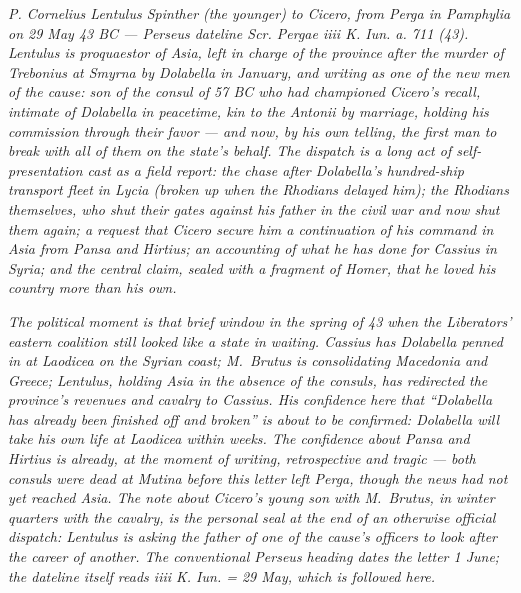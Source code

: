 
\textit{P. Cornelius Lentulus Spinther (the younger) to Cicero,
from Perga in Pamphylia on 29 May 43 BC --- Perseus dateline
\textit{Scr. Pergae iiii K. Iun. a. 711 (43)}.
Lentulus is proquaestor of Asia, left in charge of the province
after the murder of Trebonius at Smyrna by Dolabella in January,
and writing as one of the new men of the cause: son of the consul of
57 BC who had championed Cicero's recall, intimate of Dolabella in
peacetime, kin to the Antonii by marriage, holding his commission
through their favor --- and now, by his own telling, the first man
to break with all of them on the state's behalf. The dispatch is a
long act of self-presentation cast as a field report: the chase
after Dolabella's hundred-ship transport fleet in Lycia (broken up
when the Rhodians delayed him); the Rhodians themselves, who shut
their gates against his father in the civil war and now shut them
again; a request that Cicero secure him a continuation of his
command in Asia from Pansa and Hirtius; an accounting of what he
has done for Cassius in Syria; and the central claim, sealed with
a fragment of Homer, that he loved his country more than his own.}

\textit{The political moment is that brief window in the spring of
43 when the Liberators' eastern coalition still looked like a state
in waiting. Cassius has Dolabella penned in at Laodicea on the
Syrian coast; M.~Brutus is consolidating Macedonia and Greece;
Lentulus, holding Asia in the absence of the consuls, has redirected
the province's revenues and cavalry to Cassius. His confidence here
that ``Dolabella has already been finished off and broken'' is
about to be confirmed: Dolabella will take his own life at Laodicea
within weeks. The confidence about Pansa and Hirtius is already, at
the moment of writing, retrospective and tragic --- both consuls
were dead at Mutina before this letter left Perga, though the news
had not yet reached Asia. The note about Cicero's young son with
M.~Brutus, in winter quarters with the cavalry, is the personal
seal at the end of an otherwise official dispatch: Lentulus is
asking the father of one of the cause's officers to look after the
career of another. The conventional Perseus heading dates the letter
1 June; the dateline itself reads \textit{iiii K. Iun.} = 29 May,
which is followed here.}

